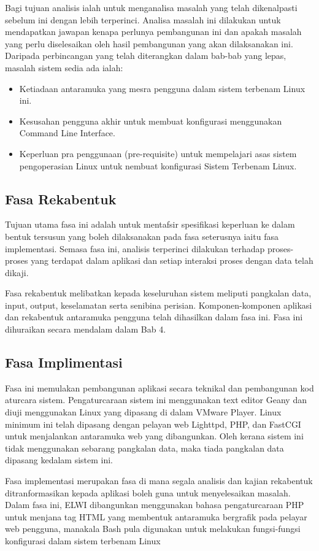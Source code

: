 Bagi tujuan analisis ialah untuk menganalisa masalah yang telah dikenalpasti sebelum ini dengan lebih terperinci. Analisa masalah ini dilakukan untuk mendapatkan jawapan kenapa perlunya pembangunan ini dan apakah masalah yang perlu diselesaikan oleh hasil pembangunan yang akan dilaksanakan ini. Daripada perbincangan yang telah diterangkan dalam bab-bab yang lepas, masalah sistem sedia ada ialah:
\begin{itemize}
\item Ketiadaan antaramuka yang mesra pengguna dalam sistem terbenam Linux ini.
\item Kesusahan pengguna akhir untuk membuat konfigurasi menggunakan Command Line Interface.
\item Keperluan pra penggunaan (pre-requisite) untuk mempelajari asas sistem pengoperasian Linux untuk nembuat konfigurasi Sistem Terbenam Linux.
\end{itemize}

\subsection{Fasa Rekabentuk}
Tujuan utama fasa ini adalah untuk mentafsir spesifikasi keperluan ke dalam bentuk tersusun yang boleh dilaksanakan pada fasa seterusnya iaitu fasa implementasi. Semasa fasa ini, analisis terperinci dilakukan terhadap proses-proses yang terdapat dalam aplikasi dan setiap interaksi proses dengan data telah dikaji.

Fasa rekabentuk melibatkan kepada keseluruhan sistem meliputi pangkalan data, input, output, keselamatan serta senibina perisian. Komponen-komponen aplikasi dan rekabentuk antaramuka pengguna telah dihasilkan dalam fasa ini. Fasa ini dihuraikan secara mendalam dalam Bab 4.

\subsection{Fasa Implimentasi}
Fasa ini memulakan pembangunan aplikasi secara teknikal dan pembangunan kod aturcara sistem. Pengaturcaraan sistem ini menggunakan text editor Geany dan diuji menggunakan Linux yang dipasang di dalam VMware Player. Linux minimum ini telah dipasang dengan pelayan web Lighttpd, PHP, dan FastCGI untuk menjalankan antaramuka web yang dibangunkan. Oleh kerana sistem ini tidak menggunakan sebarang pangkalan data, maka tiada pangkalan data dipasang kedalam sistem ini.

Fasa implementasi merupakan fasa di mana segala analisis dan kajian rekabentuk ditranformasikan kepada aplikasi boleh guna untuk menyelesaikan masalah. Dalam fasa ini, ELWI dibangunkan menggunakan bahasa pengaturcaraan PHP untuk menjana tag HTML yang membentuk antaramuka bergrafik pada pelayar web pengguna, manakala Bash pula digunakan untuk melakukan fungsi-fungsi konfigurasi dalam sistem terbenam Linux

